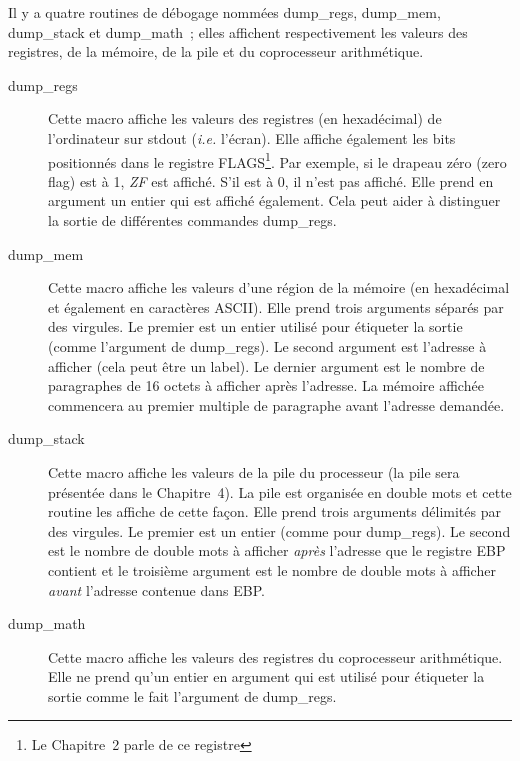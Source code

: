Il y a quatre routines de débogage nommées {\code dump\_regs}, {\code
dump\_mem}, {\code dump\_stack} et {\code dump\_math}~; elles affichent
respectivement les valeurs des registres, de la mémoire, de la pile et
du coprocesseur arithmétique.
\begin{description}

\item[dump\_regs]
Cette macro affiche les valeurs des registres (en hexadécimal) de l'ordinateur
sur {\code stdout} (\emph{i.e.} l'écran). Elle affiche également les bits
positionnés dans le registre FLAGS\footnote{Le Chapitre~2 parle de ce registre}.
Par exemple, si le drapeau zéro (zero flag) est à 1, \emph{ZF} est affiché.
S'il est à 0, il n'est pas affiché. Elle prend en argument un entier qui est
affiché également. Cela peut aider à distinguer la sortie de différentes
commandes {\code dump\_regs}.

\item[dump\_mem]
Cette macro affiche les valeurs d'une région de la mémoire (en hexadécimal et
également en caractères ASCII). Elle prend trois arguments séparés par des
virgules. Le premier est un entier utilisé pour étiqueter la sortie
(comme l'argument de {\code dump\_regs}). Le second argument est
l'adresse à afficher (cela peut être un label). Le dernier argument est le
nombre de paragraphes de 16 octets à afficher après l'adresse. La mémoire
affichée commencera au premier multiple de paragraphe avant l'adresse
demandée.

\item[dump\_stack]
Cette macro affiche les valeurs de la pile du processeur (la pile sera
présentée dans le Chapitre~4). La pile est organisée en double mots
et cette routine les affiche de cette façon. Elle prend trois arguments
délimités par des virgules. Le premier est un entier (comme pour {\code
dump\_regs}). Le second est le nombre de double mots à afficher
\emph{après} l'adresse que le registre {\code EBP} contient et le troisième
argument est le nombre de double mots à afficher \emph{avant} l'adresse
contenue dans {\code EBP}.

\item[dump\_math]
Cette macro affiche les valeurs des registres du coprocesseur arithmétique.
Elle ne prend qu'un entier en argument qui est utilisé pour étiqueter la
sortie comme le fait l'argument de {\code dump\_regs}.
\end{description}

